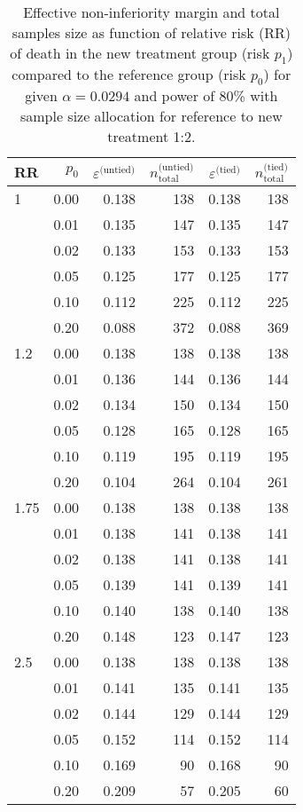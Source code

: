 \documentclass[bimj,fleqn]{w-art}\usepackage[]{graphicx}\usepackage[]{color}
\theoremstyle{plain}
\theoremstyle{definition}
\begin{document}
\begin{table}[ht]
\centering
\caption{Effective non-inferiority margin and total samples size as function of relative risk (RR) of death in the new treatment group (risk $p_1$) compared to the reference group (risk $p_0$) for given $\alpha = 0.0294$ and power of 80\% with sample size allocation for reference to new treatment 1:2.} 
\label{tab:test}
\begin{tabular}{lrrrrr}
  \hline
RR & $p_0$ & $\varepsilon^{\text{(untied)}}$ & $n^{\text{(untied)}}_{\text{total}}$ & $\varepsilon^{\text{(tied)}}$ & $n^{\text{(tied)}}_{\text{total}}$ \\ 
  \hline
1 & 0.00 & 0.138 & 138 & 0.138 & 138 \\ 
    & 0.01 & 0.135 & 147 & 0.135 & 147 \\ 
    & 0.02 & 0.133 & 153 & 0.133 & 153 \\ 
    & 0.05 & 0.125 & 177 & 0.125 & 177 \\ 
    & 0.10 & 0.112 & 225 & 0.112 & 225 \\ 
    & 0.20 & 0.088 & 372 & 0.088 & 369 \\ 
  1.2 & 0.00 & 0.138 & 138 & 0.138 & 138 \\ 
    & 0.01 & 0.136 & 144 & 0.136 & 144 \\ 
    & 0.02 & 0.134 & 150 & 0.134 & 150 \\ 
    & 0.05 & 0.128 & 165 & 0.128 & 165 \\ 
    & 0.10 & 0.119 & 195 & 0.119 & 195 \\ 
    & 0.20 & 0.104 & 264 & 0.104 & 261 \\ 
  1.75 & 0.00 & 0.138 & 138 & 0.138 & 138 \\ 
    & 0.01 & 0.138 & 141 & 0.138 & 141 \\ 
    & 0.02 & 0.138 & 141 & 0.138 & 141 \\ 
    & 0.05 & 0.139 & 141 & 0.139 & 141 \\ 
    & 0.10 & 0.140 & 138 & 0.140 & 138 \\ 
    & 0.20 & 0.148 & 123 & 0.147 & 123 \\ 
  2.5 & 0.00 & 0.138 & 138 & 0.138 & 138 \\ 
    & 0.01 & 0.141 & 135 & 0.141 & 135 \\ 
    & 0.02 & 0.144 & 129 & 0.144 & 129 \\ 
    & 0.05 & 0.152 & 114 & 0.152 & 114 \\ 
    & 0.10 & 0.169 & 90 & 0.168 & 90 \\ 
    & 0.20 & 0.209 & 57 & 0.205 & 60 \\ 
   \hline
\end{tabular}
\end{table}
\end{document}
